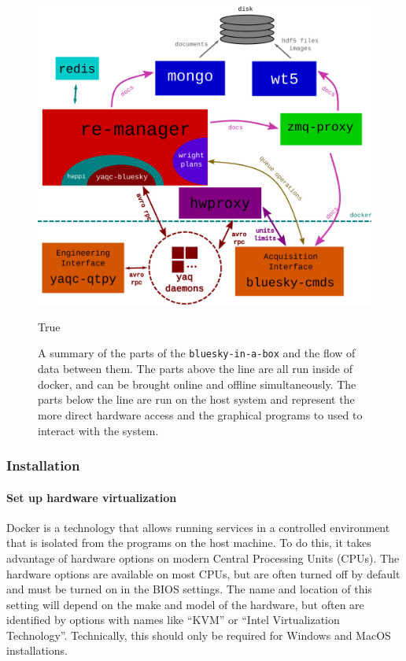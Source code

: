 \begin{figure}
\includegraphics[width=7in]{"acquisition/images/bluesky-in-a-box-architecture"}
\caption[\texttt{bluesky-in-a-box} architecture]{
A summary of the parts of the \texttt{bluesky-in-a-box} and the flow of data between them.
The parts above the line are all run inside of docker, and can be brought online and offline simultaneously.
The parts below the line are run on the host system and represent the more direct hardware access and the graphical programs to used to interact with the system.
}
True
\label{acq:fig:biab_arch}
\end{figure}

\subsubsection{Installation}
\label{biab-install}

\paragraph{Set up hardware virtualization}

Docker is a technology that allows running services in a controlled environment that is isolated from the programs on the host machine.
To do this, it takes advantage of hardware options on modern Central Processing Units (CPUs).
The hardware options are available on most CPUs, but are often turned off by default and must be turned on in the BIOS settings.
The name and location of this setting will depend on the make and model of the hardware, but often are identified by options with names like ``KVM'' or ``Intel Virtualization Technology''.
Technically, this should only be required for Windows and MacOS installations.

